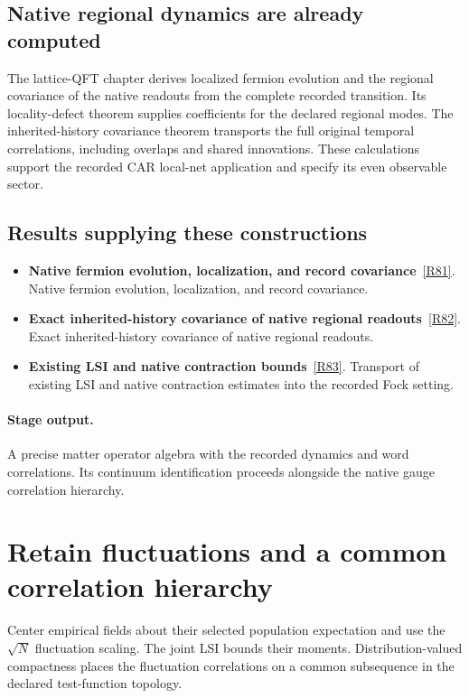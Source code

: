 \documentclass[11pt,a4paper]{article}
\begin{document}
\subsection*{Native regional dynamics are already computed}
The lattice-QFT chapter derives localized fermion evolution and the regional covariance of the native readouts from the complete recorded transition. Its locality-defect theorem supplies coefficients for the declared regional modes. The inherited-history covariance theorem transports the full original temporal correlations, including overlaps and shared innovations. These calculations support the recorded CAR local-net application and specify its even observable sector.
\subsection*{Results supplying these constructions}
\begin{itemize}
\item \textbf{Native fermion evolution, localization, and record covariance}~\hyperref[src:thm-lqft-native-local-fermion-evolution]{[R81]}. Native fermion evolution, localization, and record covariance.
\item \textbf{Exact inherited-history covariance of native regional readouts}~\hyperref[src:thm-lqft-inherited-history-covariance]{[R82]}. Exact inherited-history covariance of native regional readouts.
\item \textbf{Existing LSI and native contraction bounds}~\hyperref[src:cor-lqft-fock-lsi-transfer]{[R83]}. Transport of existing LSI and native contraction estimates into the recorded Fock setting.
\end{itemize}
\paragraph{Stage output.} A precise matter operator algebra with the recorded dynamics and word correlations. Its continuum identification proceeds alongside the native gauge correlation hierarchy.

\section{Retain fluctuations and a common correlation hierarchy}
\label{stage:14}
Center empirical fields about their selected population expectation and use the \(\sqrt N\) fluctuation scaling. The joint LSI bounds their moments. Distribution-valued compactness places the fluctuation correlations on a common subsequence in the declared test-function topology.
\end{document}
